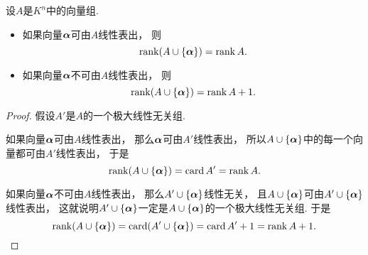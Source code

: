 \begin{proposition}\label{theorem:向量组的秩.并集的秩}
设\(A\)是\(K^n\)中的向量组.
\begin{itemize}
	\item 如果向量\(\boldsymbol\alpha\)可由\(A\)线性表出，
	则\begin{equation*}
		\rank(A \cup \{\boldsymbol\alpha\}) = \rank A.
	\end{equation*}

	\item 如果向量\(\boldsymbol\alpha\)不可由\(A\)线性表出，
	则\begin{equation*}
		\rank(A \cup \{\boldsymbol\alpha\}) = \rank A + 1.
	\end{equation*}
\end{itemize}
\begin{proof}
假设\(A'\)是\(A\)的一个极大线性无关组.

如果向量\(\boldsymbol\alpha\)可由\(A\)线性表出，
那么\(\boldsymbol\alpha\)可由\(A'\)线性表出，
所以\(A \cup \{\boldsymbol\alpha\}\)中的每一个向量都可由\(A'\)线性表出，
于是\begin{equation*}
	\rank(A \cup \{\boldsymbol\alpha\})
	= \operatorname{card} A'
	= \rank A.
\end{equation*}

如果向量\(\boldsymbol\alpha\)不可由\(A\)线性表出，
那么\(A' \cup \{\boldsymbol\alpha\}\)线性无关，
且\(A \cup \{\boldsymbol\alpha\}\)可由\(A' \cup \{\boldsymbol\alpha\}\)线性表出，
这就说明\(A' \cup \{\boldsymbol\alpha\}\)一定是\(A \cup \{\boldsymbol\alpha\}\)的一个极大线性无关组.
于是\begin{equation*}
	\rank(A \cup \{\boldsymbol\alpha\})
	= \operatorname{card}(A' \cup \{\boldsymbol\alpha\})
	= \operatorname{card} A' + 1
	= \rank A + 1.
	\qedhere
\end{equation*}
\end{proof}
\end{proposition}


